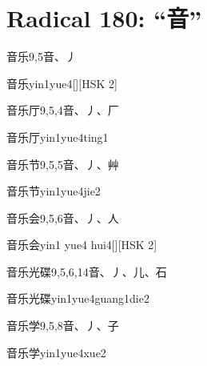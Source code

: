 
\section*{Radical 180: ``⾳''}

\begin{entry}{音乐}{9,5}{⾳、⼃}
  \begin{phonetics}{音乐}{yin1yue4}[][HSK 2]
  \end{phonetics}
\end{entry}

\begin{entry}{音乐厅}{9,5,4}{⾳、⼃、⼚}
  \begin{phonetics}{音乐厅}{yin1yue4ting1}
  \end{phonetics}
\end{entry}

\begin{entry}{音乐节}{9,5,5}{⾳、⼃、⾋}
  \begin{phonetics}{音乐节}{yin1yue4jie2}
  \end{phonetics}
\end{entry}

\begin{entry}{音乐会}{9,5,6}{⾳、⼃、⼈}
  \begin{phonetics}{音乐会}{yin1 yue4 hui4}[][HSK 2]
  \end{phonetics}
\end{entry}

\begin{entry}{音乐光碟}{9,5,6,14}{⾳、⼃、⼉、⽯}
  \begin{phonetics}{音乐光碟}{yin1yue4guang1die2}
  \end{phonetics}
\end{entry}

\begin{entry}{音乐学}{9,5,8}{⾳、⼃、⼦}
  \begin{phonetics}{音乐学}{yin1yue4xue2}
  \end{phonetics}
\end{entry}


